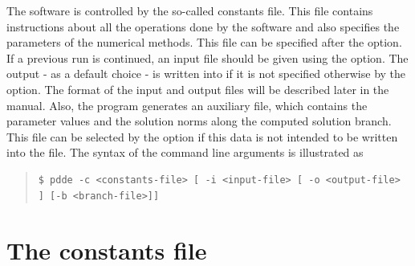 \documentclass[10pt,a4paper]{ddedoc}
\begin{document}
The software is controlled by the so-called constants file. This file contains
instructions about all the operations done by the software and also specifies the parameters of the numerical methods.
This file can be specified after the  option. If a previous run is continued, an input file should be given using the  option. The output - as a default choice - is written into  if it is not specified otherwise by the  option. The format of the input and output files will be described later in the manual. Also, the program generates an auxiliary file, which contains the parameter values and the solution norms along the computed solution branch.
This file can be selected by the  option if this data is not intended to be written into the  file. The syntax of the command line arguments is illustrated as
{ \small \begin{quote} \begin{lstlisting}[basicstyle=\tt,frame=single]
$ pdde -c <constants-file> [ -i <input-file> [ -o <output-file> ] [-b <branch-file>]]
\end{lstlisting} \end{quote} } \noindent

\section{The constants file}
\label{constfile}
\end{document}
